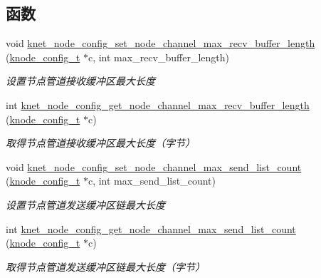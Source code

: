 \subsection*{函数}
\begin{DoxyCompactItemize}
\item 
void \hyperlink{a00104_af87f15267112e0caf225c67083fdf3ba_af87f15267112e0caf225c67083fdf3ba}{knet\+\_\+node\+\_\+config\+\_\+set\+\_\+node\+\_\+channel\+\_\+max\+\_\+recv\+\_\+buffer\+\_\+length} (\hyperlink{a00066_af1cfaee0eb1c76ebf06076b95cc47ee1_af1cfaee0eb1c76ebf06076b95cc47ee1}{knode\+\_\+config\+\_\+t} $\ast$c, int max\+\_\+recv\+\_\+buffer\+\_\+length)
\begin{DoxyCompactList}\small\item\em 设置节点管道接收缓冲区最大长度 \end{DoxyCompactList}\item 
int \hyperlink{a00104_a646e4715ce4e9b24f5c3da98dd9172ec_a646e4715ce4e9b24f5c3da98dd9172ec}{knet\+\_\+node\+\_\+config\+\_\+get\+\_\+node\+\_\+channel\+\_\+max\+\_\+recv\+\_\+buffer\+\_\+length} (\hyperlink{a00066_af1cfaee0eb1c76ebf06076b95cc47ee1_af1cfaee0eb1c76ebf06076b95cc47ee1}{knode\+\_\+config\+\_\+t} $\ast$c)
\begin{DoxyCompactList}\small\item\em 取得节点管道接收缓冲区最大长度（字节） \end{DoxyCompactList}\item 
void \hyperlink{a00104_a0b340048d9d40d2443182e7193fb9129_a0b340048d9d40d2443182e7193fb9129}{knet\+\_\+node\+\_\+config\+\_\+set\+\_\+node\+\_\+channel\+\_\+max\+\_\+send\+\_\+list\+\_\+count} (\hyperlink{a00066_af1cfaee0eb1c76ebf06076b95cc47ee1_af1cfaee0eb1c76ebf06076b95cc47ee1}{knode\+\_\+config\+\_\+t} $\ast$c, int max\+\_\+send\+\_\+list\+\_\+count)
\begin{DoxyCompactList}\small\item\em 设置节点管道发送缓冲区链最大长度 \end{DoxyCompactList}\item 
int \hyperlink{a00104_abe92a4dcbd1299b2758da26455cb6c68_abe92a4dcbd1299b2758da26455cb6c68}{knet\+\_\+node\+\_\+config\+\_\+get\+\_\+node\+\_\+channel\+\_\+max\+\_\+send\+\_\+list\+\_\+count} (\hyperlink{a00066_af1cfaee0eb1c76ebf06076b95cc47ee1_af1cfaee0eb1c76ebf06076b95cc47ee1}{knode\+\_\+config\+\_\+t} $\ast$c)
\begin{DoxyCompactList}\small\item\em 取得节点管道发送缓冲区链最大长度（字节） \end{DoxyCompactList}\item 

\end{DoxyCompactItemize}
